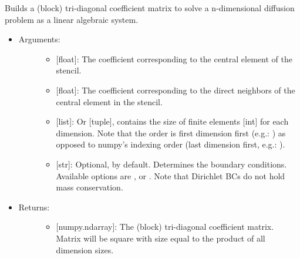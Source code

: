 \documentclass[letterpaper,10pt,english]{sphinxmanual}
\begin{document}
\begin{fulllineitems}
\label{\detokenize{diffusion:data_tools.diffusion.build_mat}}
Builds a (block) tri-diagonal coefficient matrix to solve a
n-dimensional diffusion problem as a linear algebraic system.
\begin{itemize}
\item {} \begin{description}
\item[{Arguments:}] \leavevmode\begin{itemize}
\item {} 
 {[}float{]}: The coefficient corresponding to the central
element of the stencil.

\item {} 
 {[}float{]}: The coefficient corresponding to the direct
neighbors of the central element in the stencil.

\item {} 
 {[}list{]}: Or {[}tuple{]}, contains the size of finite
elements {[}int{]} for each dimension. Note that the order is
first dimension first (e.g.: \sphinxcode{\sphinxupquote{{[}x, y, z{]}}}) as opposed to
numpy’s indexing order (last dimension first, e.g.:
\sphinxcode{\sphinxupquote{{[}z, y, x{]}}}).

\item {} 
 {[}str{]}: Optional,  by default. Determines
the boundary conditions. Available options are ,
 or . Note that Dirichlet BCs do
not hold mass conservation.

\end{itemize}

\end{description}

\item {} \begin{description}
\item[{Returns:}] \leavevmode\begin{itemize}
\item {} 
{[}numpy.ndarray{]}: The (block) tri-diagonal coefficient matrix.
Matrix will be square with size equal to the product of all
dimension sizes.

\end{itemize}

\end{description}

\end{itemize}

\end{fulllineitems}
\end{document}
